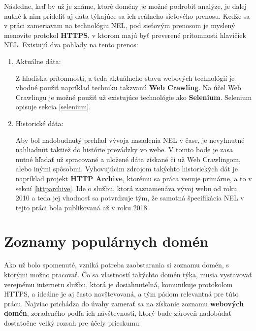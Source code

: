 Následne, keď by už je známe, ktoré domény je možné podrobiť analýze, je ďalej nutné k nim prideliť aj dáta týkajúce sa ich reálneho sieťového prenosu.
Keďže sa v práci zameriavam na technológiu NEL, pod sieťovým prenosom je myslený menovite protokol \textbf{HTTPS}, v ktorom majú byť preverené prítomnosti hlavičiek NEL. 
Existujú dva pohľady na tento prenos:
\begin{enumerate}
    \item Aktuálne dáta:
    
    Z hľadiska prítomnosti, a teda aktuálneho stavu webových technológií je vhodné použiť napríklad techniku takzvanú \textbf{Web Crawling}.
    Na účel Web Crawlingu je možné použiť už existujúce technológie ako \textbf{Selenium}. 
    Selenium opisuje sekcia \ref{selenium}.

    \pagebreak
    
    \item Historické dáta:

    Aby bol nadobudnutý prehľad vývoja nasadenia NEL v čase, je nevyhnutné nahliadnuť taktiež do histórie prevádzky vo webe. 
    V tomto bode je zasa nutné hľadať už spracované a uložené dáta získané či už Web Crawlingom, alebo inými spôsobmi. 
    Vyhovujúcim zdrojom takýchto historických dát je napríklad projekt \textbf{HTTP Archive}, ktorému sa práca venuje primárne, a to v sekcií \ref{httparchive}.
    Ide o službu, ktorá zaznamenáva vývoj webu od roku 2010 a teda jej vhodnosť sa potvrdzuje tým, že samotná špecifikácia NEL v tejto práci bola publikovaná až v roku 2018.
\end{enumerate}



\section{Zoznamy populárnych domén}
\label{tranco}

Ako už bolo spomenuté, vzniká potreba zaobstarania si zoznamu domén, s ktorými možno pracovať. Čo sa vlastností takýchto domén týka,
musia vystavovať verejnému internetu službu, ktorá je dosiahnuteľná, komunikuje protokolom HTTPS, a ideálne je aj často navštevovaná,
a tým pádom relevantná pre túto prácu. 
Najviac prichádza do úvahy zamerať sa na získanie zoznamu \textbf{webových domén}, zoradeného podľa
ich návštevnosti, ktorý bude zároveň nadobúdať dostatočne veľký rozsah pre účely prieskumu. 

